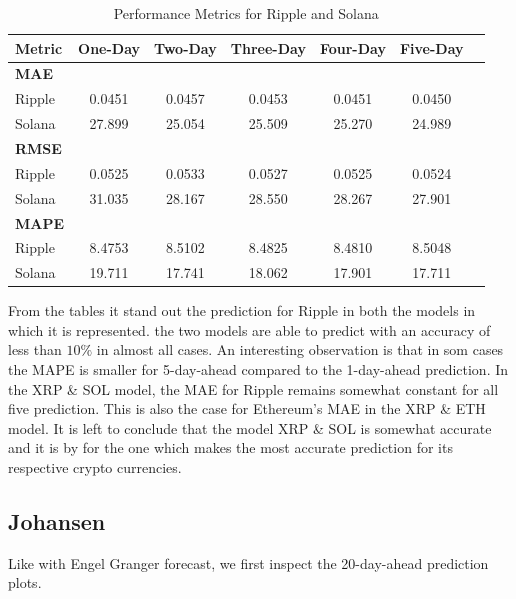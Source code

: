\begin{table}[H]
\centering
\caption{Performance Metrics for Ripple and Solana}
\begin{tabular}{lcccccc}
\toprule
\textbf{Metric} & \textbf{One-Day} & \textbf{Two-Day} & \textbf{Three-Day} & \textbf{Four-Day} & \textbf{Five-Day} \\
\midrule
\textbf{MAE} & & & & & \\
Ripple        & 0.0451 & 0.0457 & 0.0453 & 0.0451 & 0.0450 \\
Solana        & 27.899 & 25.054 & 25.509 & 25.270 & 24.989 \\
\midrule
\textbf{RMSE} & & & & & \\
Ripple        & 0.0525 & 0.0533 & 0.0527 & 0.0525 & 0.0524 \\
Solana        & 31.035 & 28.167 & 28.550 & 28.267 & 27.901 \\
\midrule
\textbf{MAPE} & & & & & \\
Ripple        & 8.4753 & 8.5102 & 8.4825 & 8.4810 & 8.5048 \\
Solana        & 19.711 & 17.741 & 18.062 & 17.901 & 17.711 \\
\bottomrule
\end{tabular}
\end{table}
\noindent From the tables it stand out the prediction for Ripple in both the models in which it is represented. the two models are able to predict with an accuracy of less than $10\%$ in almost all cases. An interesting observation is that in som cases the MAPE is smaller for 5-day-ahead compared to the 1-day-ahead prediction. In the XRP \& SOL model, the MAE for Ripple remains somewhat constant for all five prediction. This is also the case for Ethereum's MAE in the XRP \& ETH model. It is left to conclude that the model XRP \& SOL is somewhat accurate and it is by for the one which makes the most accurate prediction for its respective crypto currencies.
\pause

\subsection{Johansen}
Like with Engel Granger forecast, we first inspect the 20-day-ahead prediction plots. 

